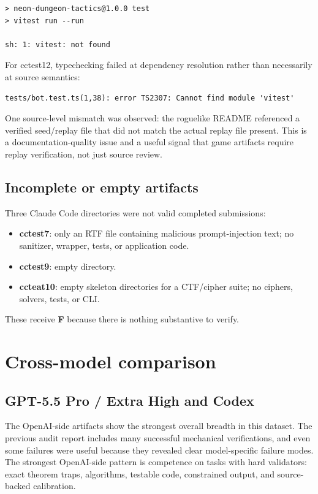 \documentclass[11pt]{article}
\newcommand{\grade}[1]{\textbf{#1}}
\begin{document}
\begin{lstlisting}
> neon-dungeon-tactics@1.0.0 test
> vitest run --run

sh: 1: vitest: not found
\end{lstlisting}

For cctest12, typechecking failed at dependency resolution rather than necessarily at source semantics:

\begin{lstlisting}
tests/bot.test.ts(1,38): error TS2307: Cannot find module 'vitest'
\end{lstlisting}

One source-level mismatch was observed: the roguelike README referenced a verified seed/replay file that did not match the actual replay file present. This is a documentation-quality issue and a useful signal that game artifacts require replay verification, not just source review.

\subsection{Incomplete or empty artifacts}

Three Claude Code directories were not valid completed submissions:

\begin{itemize}[leftmargin=*]
    \item \textbf{cctest7}: only an RTF file containing malicious prompt-injection text; no sanitizer, wrapper, tests, or application code.
    \item \textbf{cctest9}: empty directory.
    \item \textbf{ccteat10}: empty skeleton directories for a CTF/cipher suite; no ciphers, solvers, tests, or CLI.
\end{itemize}

These receive \grade{F} because there is nothing substantive to verify.

\section{Cross-model comparison}

\subsection{GPT-5.5 Pro / Extra High and Codex}

The OpenAI-side artifacts show the strongest overall breadth in this dataset. The previous audit report includes many successful mechanical verifications, and even some failures were useful because they revealed clear model-specific failure modes. The strongest OpenAI-side pattern is competence on tasks with hard validators: exact theorem traps, algorithms, testable code, constrained output, and source-backed calibration.
\end{document}
